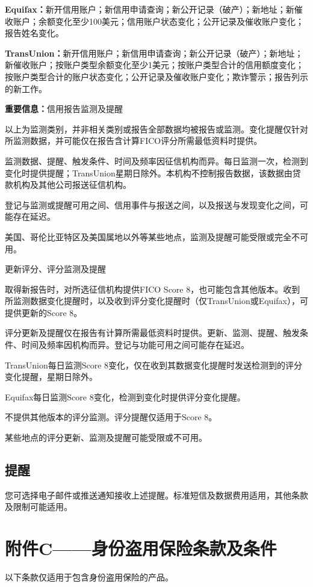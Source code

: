 \documentclass[UTF8,fontset=none,11pt,a4paper]{ctexart}
\begin{document}
\textbf{Equifax：}新开信用账户；新信用申请查询；新公开记录（破产）；新地址；新催收账户；余额变化至少100美元；信用账户状态变化；公开记录及催收账户变化；报告姓名变化。


\textbf{TransUnion：}新开信用账户；新信用申请查询；新公开记录（破产）；新地址；新催收账户；按账户类型余额变化至少1美元；按账户类型合计的信用额度变化；按账户类型合计的账户状态变化；公开记录及催收账户变化；欺诈警示；报告列示的新工作。


\textbf{重要信息：}信用报告监测及提醒


以上为监测类别，并非相关类别或报告全部数据均被报告或监测。变化提醒仅针对所监测数据，并可能仅在报告含计算FICO评分所需最低资料时提供。


监测数据、提醒、触发条件、时间及频率因征信机构而异。每日监测一次，检测到变化时提供提醒；TransUnion星期日除外。本机构不控制报告数据，该数据由贷款机构及其他公司报送征信机构。


登记与监测或提醒可用之间、信用事件与报送之间，以及报送与发现变化之间，可能存在延迟。


美国、哥伦比亚特区及美国属地以外等某些地点，监测及提醒可能受限或完全不可用。


更新评分、评分监测及提醒


取得新报告时，对所选征信机构提供FICO Score 8，也可能包含其他版本。收到所监测数据变化提醒时，以及收到评分变化提醒时（仅TransUnion或Equifax），可提供更新的Score 8。


评分更新及提醒仅在报告有计算所需最低资料时提供。更新、监测、提醒、触发条件、时间及频率因机构而异。登记与功能可用之间可能存在延迟。


TransUnion每日监测Score 8变化，仅在收到其数据变化提醒时发送检测到的评分变化提醒，星期日除外。


Equifax每日监测Score 8变化，检测到变化时提供评分变化提醒。


不提供其他版本的评分监测。评分提醒仅适用于Score 8。


某些地点的评分更新、监测及提醒可能受限或不可用。


\subsection*{提醒}
您可选择电子邮件或推送通知接收上述提醒。标准短信及数据费用适用，其他条款及限制可能适用。


\section*{附件C——身份盗用保险条款及条件}
以下条款仅适用于包含身份盗用保险的产品。
\end{document}
